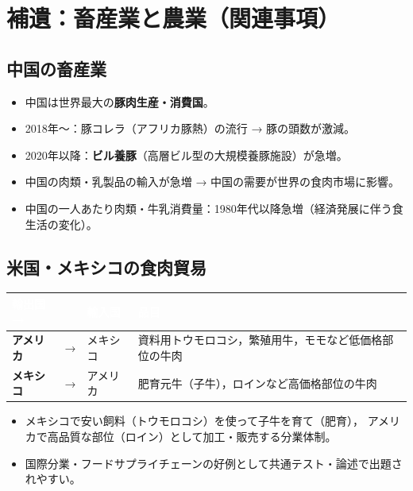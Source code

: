 \documentclass[a4paper,11pt]{article}
\newcommand{\imp}[1]{\textbf{\textcolor{mainred}{#1}}}
\begin{document}
\vspace{2mm}

\section{補遺：畜産業と農業（関連事項）}

\subsection{中国の畜産業}

\begin{tcolorbox}[notebox, title={中国の豚肉生産と消費}]
\begin{itemize}[leftmargin=1em]
  \item 中国は世界最大の\imp{豚肉生産・消費国}。
  \item 2018年〜：豚コレラ（アフリカ豚熱）の流行 → 豚の頭数が激減。
  \item 2020年以降：\imp{ビル養豚}（高層ビル型の大規模養豚施設）が急増。
  \item 中国の肉類・乳製品の輸入が急増 → 中国の需要が世界の食肉市場に影響。
  \item 中国の一人あたり肉類・牛乳消費量：1980年代以降急増（経済発展に伴う食生活の変化）。
\end{itemize}
\end{tcolorbox}

\vspace{2mm}

\subsection{米国・メキシコの食肉貿易}

\begin{tcolorbox}[pointbox, title={アメリカ・メキシコ間の食肉分業}]
\begin{center}
\begin{tabular}{C{4cm}C{1cm}C{4cm}C{4cm}}
\toprule
{}\textcolor{white}{\textbf{輸出国→}} & & \textcolor{white}{\textbf{輸入国}} & \textcolor{white}{\textbf{品目}} \\
\midrule
\imp{アメリカ} & → & メキシコ & 資料用トウモロコシ，繁殖用牛，モモなど低価格部位の牛肉 \\
\imp{メキシコ} & → & アメリカ & 肥育元牛（子牛），ロインなど高価格部位の牛肉 \\
\bottomrule
\end{tabular}
\end{center}

\medskip
\begin{itemize}[leftmargin=1em]
  \item メキシコで安い飼料（トウモロコシ）を使って子牛を育て（肥育），
    アメリカで高品質な部位（ロイン）として加工・販売する分業体制。
  \item 国際分業・フードサプライチェーンの好例として共通テスト・論述で出題されやすい。
\end{itemize}
\end{tcolorbox}
\end{document}
